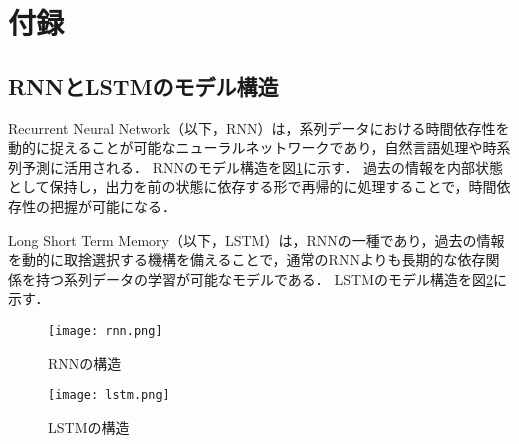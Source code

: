 \documentclass[dvipdfmx]{jreport}
\begin{document}
\section{付録}
\subsection{RNNとLSTMのモデル構造}

Recurrent Neural Network（以下，RNN）は，系列データにおける時間依存性を動的に捉えることが可能なニューラルネットワークであり，自然言語処理や時系列予測に活用される．
RNNのモデル構造を図\ref{fig:rnn}に示す．
過去の情報を内部状態として保持し，出力を前の状態に依存する形で再帰的に処理することで，時間依存性の把握が可能になる．

Long Short Term Memory（以下，LSTM）は，RNNの一種であり，過去の情報を動的に取捨選択する機構を備えることで，通常のRNNよりも長期的な依存関係を持つ系列データの学習が可能なモデルである．
LSTMのモデル構造を図\ref{fig:lstm}に示す．
\begin{figure}[h]
    \begin{center}
        \texttt{[image: rnn.png]} 
        \caption{RNNの構造} \label{fig:rnn}
    \end{center}
\end{figure}

\begin{figure}[h]
    \begin{center}
        \texttt{[image: lstm.png]} 
        \caption{LSTMの構造} \label{fig:lstm}
    \end{center}
\end{figure}


\end{document}
